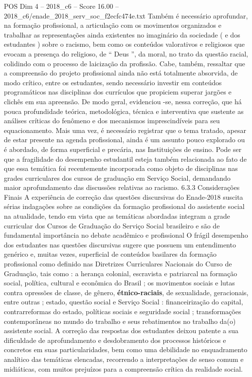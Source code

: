 \begin{textsample}{POS Dim 4 – 2018\_c6 – Score 16.00 – 2018\_c6/enade\_2018\_serv\_soc\_f2ecfc474e.txt}
Também é necessário aprofundar, na formação profissional, a articulação com os movimentos organizados e trabalhar as representações ainda existentes no imaginário da sociedade ( e dos estudantes ) sobre o racismo, bem como os conteúdos valorativos e religiosos que evocam a presença do religioso, de “ Deus ”, da moral, no trato da questão racial, colidindo com o processo de laicização da profissão.
Cabe, também, ressaltar que a compreensão do projeto profissional ainda não está totalmente absorvida, de modo crítico, entre os estudantes, sendo necessário investir em conteúdos programáticos nas disciplinas dos currículos que propiciem superar jargões e clichês em sua apreensão.
De modo geral, evidenciou -se, nessa correção, que há pouca profundidade teórica, metodológica, técnica e interventiva que sustente as análises críticas do fenômeno e dos mecanismos imprescindíveis para seu equacionamento.
Mais uma vez, é necessário registrar que o tema tratado, apesar de estar presente na agenda profissional, ainda é um assunto pouco explorado ou é abordado, de forma superficial e precária, nas Instituições de ensino.
Pode ser que a fragilidade do desempenho estudantil esteja também relacionada ao fato de que essa temática foi recentemente incorporada como objeto de disciplinas nas grades curriculares dos cursos de graduação em Serviço Social, demandando maior aprofundamento das discussões relativas ao racismo. 6.3.3 Considerações Finais A experiência de correção das questões discursivas do Enade-2018 suscita sérias indagações sobre as condições da formação profissional do assistente social na atualidade, tendo em vista que as temáticas abordadas integram a grade curricular dos Cursos de Graduação do Serviço Social brasileiro e são de fundamental importância no debate acadêmico e profissional O frágil desempenho dos estudantes nas questões discursivas sugere que possuem um entendimento genérico e, muitas vezes, superficial de conteúdos basilares da formação profissional como definido nas Diretrizes Curriculares Nacionais do Curso de Graduação, tais como : a herança colonial, escravista e patriarcal na formação social, política, cultural e econômica do Brasil ; os movimentos sociais e lutas contra opressões de classe, de gênero, \textbf{étnico-raciais}, de sexualidade, geracionais, entre outras ; estado, questão social e Serviço Social : financeirização do capital, contrarreformas do estado, políticas sociais e seguridade social ; transformações contemporâneas no mundo do trabalho e seus rebatimentos no trabalho da(o) assistente social.
A correção das respostas dos estudantes deixou patente a sua dificuldade de aprofundamento e desdobramento dos processos históricos e concretos em suas particularidades, bem como uma debilidade no enquadramento analítico das temáticas elencadas, recorrendo a interpretações de senso comum e midiáticas, com muitos prejuízos para a compreensão crítica da realidade social.

\end{textsample}
